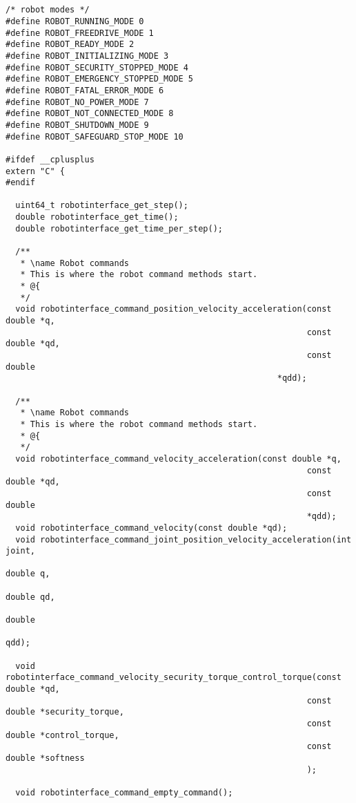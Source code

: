 \documentclass[
a4paper,
12pt,
oneside,
headsepline,		%
footsepline,		%
]{scrbook}
\begin{document}
\begin{lstlisting}


/* robot modes */
#define ROBOT_RUNNING_MODE 0
#define ROBOT_FREEDRIVE_MODE 1
#define ROBOT_READY_MODE 2
#define ROBOT_INITIALIZING_MODE 3
#define ROBOT_SECURITY_STOPPED_MODE 4
#define ROBOT_EMERGENCY_STOPPED_MODE 5
#define ROBOT_FATAL_ERROR_MODE 6
#define ROBOT_NO_POWER_MODE 7
#define ROBOT_NOT_CONNECTED_MODE 8
#define ROBOT_SHUTDOWN_MODE 9
#define ROBOT_SAFEGUARD_STOP_MODE 10

#ifdef __cplusplus
extern "C" {
#endif

  uint64_t robotinterface_get_step();
  double robotinterface_get_time();
  double robotinterface_get_time_per_step();

  /**
   * \name Robot commands
   * This is where the robot command methods start.
   * @{
   */
  void robotinterface_command_position_velocity_acceleration(const double *q,
                                                             const double *qd,
                                                             const double
                                                       *qdd);

  /**
   * \name Robot commands
   * This is where the robot command methods start.
   * @{
   */
  void robotinterface_command_velocity_acceleration(const double *q,
                                                             const double *qd,
                                                             const double
                                                             *qdd);
  void robotinterface_command_velocity(const double *qd);
  void robotinterface_command_joint_position_velocity_acceleration(int joint,
                                                                   double q,
                                                                   double qd,
                                                                   double
                                                                   qdd);

  void robotinterface_command_velocity_security_torque_control_torque(const double *qd,
                                                             const double *security_torque,
                                                             const double *control_torque,
                                                             const double *softness
                                                             );

  void robotinterface_command_empty_command();


\end{lstlisting}
\end{document}
